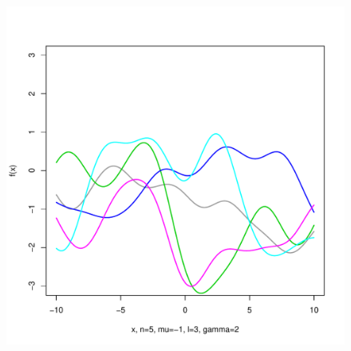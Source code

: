 \documentclass[12pt,letterpaper]{article}
\begin{document}
\begin{figure}
\begin{center}
\includegraphics[scale=0.2]{hw321/n5-m-1-l3-g4.pdf}
\end{center}
\end{figure}
\end{document}
